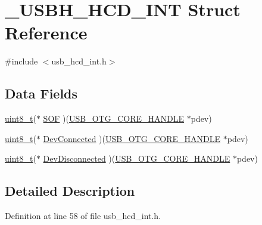 \hypertarget{struct___u_s_b_h___h_c_d___i_n_t}{\section{\-\_\-\-U\-S\-B\-H\-\_\-\-H\-C\-D\-\_\-\-I\-N\-T Struct Reference}
\label{struct___u_s_b_h___h_c_d___i_n_t}
}


{\ttfamily \#include $<$usb\-\_\-hcd\-\_\-int.\-h$>$}

\subsection*{Data Fields}
\begin{DoxyCompactItemize}
\item 
\hyperlink{stdint_8h_aba7bc1797add20fe3efdf37ced1182c5}{uint8\-\_\-t}($\ast$ \hyperlink{struct___u_s_b_h___h_c_d___i_n_t_afec175f8af7c52005d7548103c02a7b2}{S\-O\-F} )(\hyperlink{group___u_s_b___c_o_r_e___exported___types_gaf76054c11eb8a3367907aad7ae700e80}{U\-S\-B\-\_\-\-O\-T\-G\-\_\-\-C\-O\-R\-E\-\_\-\-H\-A\-N\-D\-L\-E} $\ast$pdev)
\item 
\hyperlink{stdint_8h_aba7bc1797add20fe3efdf37ced1182c5}{uint8\-\_\-t}($\ast$ \hyperlink{struct___u_s_b_h___h_c_d___i_n_t_a6676a0201cc454aadafaab49fefea411}{Dev\-Connected} )(\hyperlink{group___u_s_b___c_o_r_e___exported___types_gaf76054c11eb8a3367907aad7ae700e80}{U\-S\-B\-\_\-\-O\-T\-G\-\_\-\-C\-O\-R\-E\-\_\-\-H\-A\-N\-D\-L\-E} $\ast$pdev)
\item 
\hyperlink{stdint_8h_aba7bc1797add20fe3efdf37ced1182c5}{uint8\-\_\-t}($\ast$ \hyperlink{struct___u_s_b_h___h_c_d___i_n_t_a29a5d6fd63a8b3c9530e3290001964a4}{Dev\-Disconnected} )(\hyperlink{group___u_s_b___c_o_r_e___exported___types_gaf76054c11eb8a3367907aad7ae700e80}{U\-S\-B\-\_\-\-O\-T\-G\-\_\-\-C\-O\-R\-E\-\_\-\-H\-A\-N\-D\-L\-E} $\ast$pdev)
\end{DoxyCompactItemize}


\subsection{Detailed Description}


Definition at line 58 of file usb\-\_\-hcd\-\_\-int.\-h.



